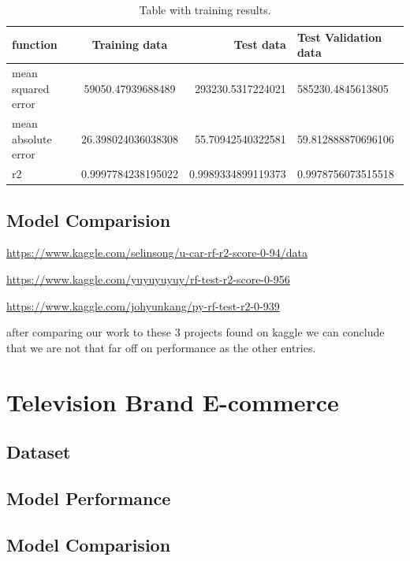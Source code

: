 \begin{table}[h!]
    \begin{center}
        \caption{Table with training results.}
        \label{tab:training results}
        \begin{tabular}{l|S|r|l} %
            \textbf{function} & \textbf{Training data} & \textbf{Test data} & \textbf{Test Validation data}\\
            \hline
            mean squared error & 59050.47939688489 & 293230.5317224021 & 585230.4845613805\\
            mean absolute error & 26.398024036038308 & 55.70942540322581 & 59.812888870696106\\
            r2 & 0.9997784238195022 & 0.9989334899119373 & 0.9978756073515518\\
        \end{tabular}
    \end{center}
\end{table}

\subsection{Model Comparision}


\url{https://www.kaggle.com/selinsong/u-car-rf-r2-score-0-94/data}

\url{https://www.kaggle.com/yuyuyuyuy/rf-test-r2-score-0-956}

\url{https://www.kaggle.com/johyunkang/py-rf-test-r2-0-939}

after comparing our work to these 3 projects found on kaggle we can conclude that we are not that far off on performance as the other entries.
\section{Television Brand E-commerce}
\lipsum[2-2]

\subsection{Dataset}
\lipsum[2-2]

\subsection{Model Performance}
\lipsum[2-2]

\subsection{Model Comparision}
\lipsum[2-2]